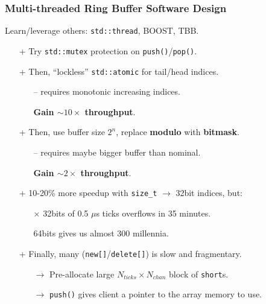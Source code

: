 \documentclass[xcolor=dvipsnames]{beamer}
\begin{document}
\begin{frame}
  \frametitle{Multi-threaded Ring Buffer Software Design}

  Learn/leverage others: \texttt{std::thread}, BOOST, TBB.
  \begin{itemize}
  \item[+] Try \texttt{std::mutex} protection on \texttt{push()}/\texttt{pop()}.
  \item[+] Then, ``lockless'' \texttt{std::atomic} for tail/head indices.
    \begin{itemize}\footnotesize
    \item[--] requires monotonic increasing indices.
    \item[\checkmark] \textbf{Gain $\sim 10\times$ throughput}.
    \end{itemize}
  \item[+] Then, use buffer size $2^n$, replace \textbf{modulo} with
    \textbf{bitmask}.
    \begin{itemize}\footnotesize
    \item[--] requires maybe bigger buffer than nominal.
    \item[\checkmark] \textbf{Gain $\sim 2\times$ throughput}.
    \end{itemize}
  \item[+] 10-20\% more speedup with \texttt{size\_t} $\to$ 32bit indices, but:
    \begin{itemize}\footnotesize
    \item[$\times$] 32bits of 0.5 $\mu$s ticks overflows in 35 minutes.
    \item[\checkmark] 64bits gives us almost 300 millennia.
    \end{itemize}
  \item[+] Finally, many (\texttt{new[]}/\texttt{delete[]}) is slow and fragmentary.
    \begin{itemize}\footnotesize
    \item[$\to$] Pre-allocate large $N_{ticks} \times N_{chan}$ block
      of \texttt{short}s.
    \item[$\to$] \texttt{push()} gives client a pointer to the
      array memory to use.
    \end{itemize}
  \end{itemize}
\end{frame}
\end{document}
